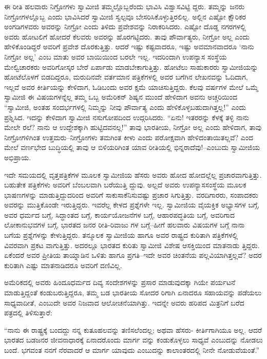 ಈ ರೀತಿ ಹಲವಾರು ನಿಗ್ರೋಗಳು ಸ್ವಾಮೀಜಿ ತಮ್ಮಲ್ಲೊಬ್ಬರೆಂದು ಭಾವಿಸಿ ವಿಶ್ವಾಸವಿಟ್ಟಿ ದ್ದರು. ತಮ್ಮನ್ನು ಜನರು ನೀಗ್ರೋಗಳಲ್ಲೊಬ್ಬ ಎಂದು ಭಾವಿಸಿದರೆ ಸ್ವಾಮೀಜಿ ಸ್ವಲ್ಪವೂ ಬೇಸರಿಸಿಕೊಳ್ಳುತ್ತಿರಲಿಲ್ಲ. ಅಲ್ಲಿನ ಎಷ್ಟೋ ಕ್ಷೌರಿಕರ ಅಂಗಡಿಗಳವರು ಅವರನ್ನು ನೀಗ್ರೋ ಎಂದು ತಿಳಿದು ಪ್ರವೇಶವನ್ನು ನಿರಾಕರಿಸಿದರು. ಎಷ್ಟೋ ದೊಡ್ಡ ನಗರಗಳಲ್ಲಿ ಅವರು ಹೋಟಲಿಗೆ ಹೋದರೆ ಕೆಲವರು ಅವರನ್ನು ಹೊರಗಟ್ಟಿದರು. ತಾವು ಪೌರ್ವಾತ್ಯರು, ನೀಗ್ರೋ ಅಲ್ಲ ಎಂದು ಹೇಳಿಕೊಂಡಿದ್ದರೆ ಅವರಿಗೆ ಪ್ರವೇಶ ದೊರಕುತ್ತಿತ್ತು. ಆದರೆ ಇಷ್ಟು ಕಷ್ಟವಾದರೂ, ಇಷ್ಟು ಅವಮಾನವಾದರೂ ‘ನಾನು ನೀಗ್ರೋ ಅಲ್ಲ’ ಎಂಬ ಮಾತು ಅವರ ಬಾಯಿಯಿಂದ ಬರಲೇ ಇಲ್ಲ. ಇದರಿಂದಾಗಿ ಉಪನ್ಯಾಸ ಸಂಸ್ಥೆಯ ಮೇಲ್ವಿಚಾರಕರು ಅವರಿಗೋಸ್ಕರ ಬೇರೆ ಏರ್ಪಾಡು ಮಾಡಬೇಕಾಗುತ್ತಿತ್ತು. ಹೋಟೆಲು ಸಾಹುಕಾರರು ಸ್ವಾಮೀಜಿಯನ್ನು ಹೋಟೆಲೊಳಗೆ ಬಿಡದಿದ್ದರೂ, ಮರುದಿನವೇ ವರ್ತಮಾನ ಪತ್ರಿಕೆಗಳಲ್ಲಿ ಅವರ ಬಗೆಗಿನ ಲೇಖನವನ್ನು ಓದಿದಾಗ, ಇಲ್ಲವೆ ಅವರ ಕೀರ್ತಿಯನ್ನು ಕೇಳಿದಾಗ, ಓಡಿಬಂದು ಅವರ ಕ್ಷಮೆ ಯಾಚಿಸುತ್ತಿದ್ದರು. ಕೆಲವು ವರ್ಷಗಳ ಮೇಲೆ ಒಮ್ಮೆ ಸ್ವಾಮೀಜಿ ಈ ವಿಷಯಗಳನ್ನೆಲ್ಲ ತಮ್ಮ ಒಬ್ಬ ಅಮೆರಿಕನ್ ಶಿಷ್ಯನ ಮುಂದೆ ಹೇಳಿದಾಗ ಅವನು ಅಚ್ಚರಿಯಿಂದ “ಸ್ವಾಮೀಜಿ, ಅಂತಹ ಸಂದರ್ಭಗಳಲ್ಲಿ ನಿಮ್ಮನ್ನು ನೀವು ಪೌರ್ವಾತ್ಯ ಎಂದು ಹೇಳಿಕೊಳ್ಳಬಹುದಾಗಿತ್ತಲ್ಲ!” ಎಂದು ಪ್ರಶ್ನಿಸಿದ. ಇದನ್ನು ಕೇಳಿದಾಗ ಸ್ವಾಮೀಜಿ ನಸುಗೋಪದಿಂದ ಉದ್ಗರಿಸಿದರು. “ಏನು! ಇತರರನ್ನು ಕೆಳಕ್ಕೆ ತಳ್ಳಿ ನಾನು ಮೇಲೇ ರಲೆ? ನಾನು ಆ ಉದ್ದೇಶಕ್ಕಾಗಿ ಹುಟ್ಟಿದವನಲ್ಲ!” ತಾವು ಭಾರತೀಯ, ನೀಗ್ರೋ ಅಲ್ಲ ಎಂದು ಹೇಳಿದಾಗ, ತಾವು ನೀಗ್ರೋಗಳಿಗಿಂತ ಉತ್ತಮರು–ನೀಗ್ರೋಗಳು ತಮಗಿಂತ ಕೀಳು ಎಂದು ಪರೋಕ್ಷವಾಗಿ ಹೇಳಿದಂತಾಯಿತಲ್ಲವೆ? ಎಂದ ಮೇಲೆ ವರ್ಣಭೇದ ಬುದ್ಧಿಯಲ್ಲಿ ತಾವು ಆ ಬಿಳಿಯರಿಗಿಂತ ಯಾವ ರೀತಿಯಲ್ಲಿ ಭಿನ್ನರಾದೆವು!–ಎಂಬುದು ಸ್ವಾಮೀಜಿಯ ಅಭಿಪ್ರಾಯ.

ಇದೇ ಸಮಯದಲ್ಲಿ ವೃತ್ತಪತ್ರಿಕೆಗಳ ಮೂಲಕ ಸ್ವಾಮೀಜಿಯ ಹೆಸರು ಅವರು ಹೋದ ಹೋದಲ್ಲೆಲ್ಲ ಪ್ರಚಾರವಾಗುತ್ತಿತ್ತು. ಬಹುತೇಕ ಪತ್ರಿಕೆಗಳು ಅವರಿಗೆ ಬೆಂಬಲವಾಗಿ ಬರೆಯುತ್ತಿ ದ್ದುವು. ಅಲ್ಲದೆ ಅವರು ಉಪನ್ಯಾಸಸಂಸ್ಥೆಯ ಮೂಲಕ ಭಾಷಣಗಳನ್ನು ಮಾಡುತ್ತಿದ್ದುದರಿಂದ ಅವರಿಗೆ ಸಾಕುಸಾಕೆನಿಸುವಷ್ಟು ಪ್ರಚಾರ ಸಿಗುತ್ತಿತ್ತು. ವರದಿಗಾರರು, ಸಂಪಾದಕರು ಅವರನ್ನು ಮುತ್ತಿಕೊಂಡೇ ಇರುತ್ತಿದ್ದರು. ಇವರೆಲ್ಲ ಕೇಳದ ಪ್ರಶ್ನೆಗಳೇ ಇಲ್ಲ. ಸ್ವಾಮೀಜಿಯ ವೈಯಕ್ತಿಕ ಅಭ್ಯಾಸಗಳ ಬಗ್ಗೆ, ಅವರ ಧರ್ಮದ ಬಗ್ಗೆ, ಸಿದ್ಧಾಂತದ ಬಗ್ಗೆ, ಕಾರ್ಯಯೋಜನೆಗಳ ಬಗ್ಗೆ, ಆಹಾರಪದ್ಧತಿಯ ಬಗ್ಗೆ, ಅವರಿಗಾದ ಲೋಕಾನುಭವಗಳ ಬಗ್ಗೆ, ಭಾರತದ ಜನರ ರೀತಿ-ರಿವಾಜು ಗಳ ಬಗ್ಗೆ–ಹೀಗೆ ಹಲವಾರು ವಿಷಯಗಳ ಬಗ್ಗೆ ನಾನಾ ಬಗೆಯ ಪ್ರಶ್ನೆಗಳನ್ನು ಕೇಳುತ್ತಿದ್ದರು. ತನ್ಮೂಲಕ ಸ್ವಾಮೀಜಿಯ ಹಾಗೂ ಅವರ ರಾಷ್ಟ್ರದ ಕುರಿತಾಗಿ ಪತ್ರಿಕೆಗಳಲ್ಲಿ ವಿವರವಾಗಿ ಪ್ರಕಟ ವಾಗುತ್ತಿತ್ತು. ಅದರಲ್ಲೂ ಭಾರತದ ಕುರಿತು ಸ್ವಾಮೀಜಿ ವಿಶೇಷ ಆಸಕ್ತಿಯಿಂದ ಮಾತನಾಡು ತ್ತಿದ್ದರು. ಏಕೆಂದರೆ ಅವರ ಪ್ರೀತಿಯ ತಾಯ್ನಾಡಿನ ಒಳಿತು ಹಾಗೂ ಪ್ರಗತಿ–ಇದೇ ಅವರ ಚಿಂತನೆಯ ಪಲ್ಲವಿಯಾಗಿತ್ತಲ್ಲವೆ? ಅದರ ಕುರಿತಾಗಿ ಎಷ್ಟು ಮಾತನಾಡಿದರೂ ಅವರಿಗೆ ದಣಿವಿಲ್ಲ.

ಅಮೆರಿಕದಲ್ಲಿ ಅವರು ಹಿಂದೂಧರ್ಮದ ದಿವ್ಯ ಸಂದೇಶಗಳನ್ನು ಪ್ರಸಾರ ಮಾಡುವುದಕ್ಕಾ ಗಿಯೇ ಪರ್ಯಟನೆ ಮಾಡುತ್ತಿದ್ದಂತೆ ಕಂಡುಬರುತ್ತಿದ್ದರೂ, ತಮ್ಮ ಬಡ ಭಾರತೀಯ ಸೋದರ ರಿಗಾಗಿ ಏನಾದರೂ ಸಹಾಯವನ್ನು ಪಡೆಯಲು ಸಾಧ್ಯವಾದೀತೆ, ಎಂಬುದೇ ಅವರ ನಿಜವಾದ ಆಲೋಚನೆಯಾಗಿತ್ತು. ಇದನ್ನೇ ಅವರು ಹರಿಪದ ಮಿತ್ರನಿಗೆ ಬರೆದ ಪತ್ರದಲ್ಲಿ ತಿಳಿಸುತ್ತಾರೆ:

“ನಾನು ಈ ರಾಷ್ಟ್ರಕ್ಕೆ ಬಂದದ್ದು ನನ್ನ ಕುತೂಹಲವನ್ನು ತಣಿಸಲೆಂದಲ್ಲ; ಅಥವಾ ಹೆಸರು- ಕೀರ್ತಿಗಾಗಿಯೂ ಅಲ್ಲ. ಆದರೆ ಭಾರತದ ಬಡಜನರ ಜೀವನಾಧಾರಕ್ಕೆ ಏನಾದರೊಂದು ಮಾರ್ಗ ವನ್ನು ಕಂಡುಕೊಳ್ಳಲು ಸಾಧ್ಯವೆ ಎಂಬುದನ್ನು ನೋಡಲು ಬಂದೆ. ಭಗವಂತ ನನಗೆ ನೆರವಾದರೆ ಆ ಮಾರ್ಗ ಯಾವುದು ಎಂಬುದನ್ನು ಕಾಲಾಂತರದಲ್ಲಿ ನೀನೇ ನೋಡುವೆಯಂತೆ.”

